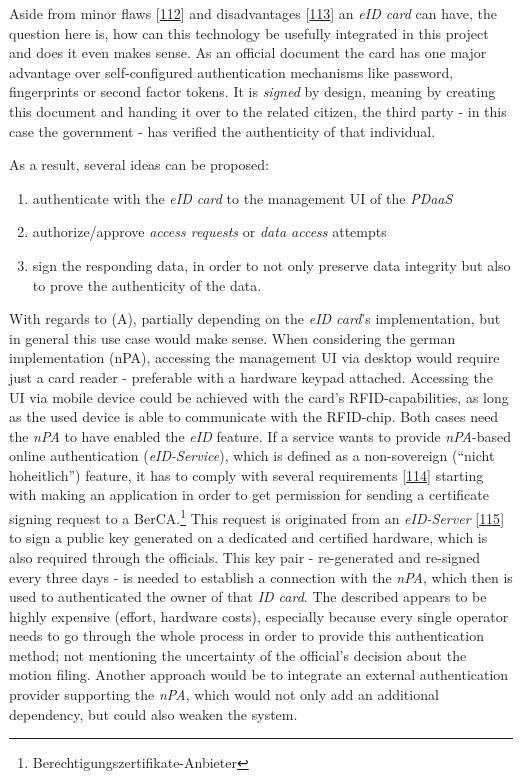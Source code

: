 \documentclass[12pt,english,a4paper,titlepage,cleardoublepage=empty,dottedtoc]{report}
\providecommand{\tightlist}{%
  \setlength{\itemsep}{0pt}\setlength{\parskip}{0pt}}
\begin{document}
Aside from minor flaws
{[}\protect\hyperlink{ref-web_2013_npa-sicherheitsdefizit}{112}{]} and
disadvantages
{[}\protect\hyperlink{ref-web_2014_test-qes-support-in-npa}{113}{]} an
\emph{eID card} can have, the question here is, how can this technology
be usefully integrated in this project and does it even makes sense. As
an official document the card has one major advantage over
self-configured authentication mechanisms like password, fingerprints or
second factor tokens. It is \emph{signed} by design, meaning by creating
this document and handing it over to the related citizen, the third
party - in this case the government - has verified the authenticity of
that individual.

As a result, several ideas can be proposed:

\begin{enumerate}
\def\labelenumi{(\Alph{enumi})}
\tightlist
\item
  authenticate with the \emph{eID card} to the management UI of the
  \emph{PDaaS}
\item
  authorize/approve \emph{access requests} or \emph{data access}
  attempts
\item
  sign the responding data, in order to not only preserve data integrity
  but also to prove the authenticity of the data.
\end{enumerate}

With regards to (A), partially depending on the \emph{eID card}'s
implementation, but in general this use case would make sense. When
considering the german implementation (nPA), accessing the management UI
via desktop would require just a card reader - preferable with a
hardware keypad attached. Accessing the UI via mobile device could be
achieved with the card's RFID-capabilities, as long as the used device
is able to communicate with the RFID-chip. Both cases need the
\emph{nPA} to have enabled the \emph{eID} feature. If a service wants to
provide \emph{nPA}-based online authentication (\emph{eID-Service}),
which is defined as a non-sovereign (``nicht hoheitlich'') feature, it
has to comply with several requirements
{[}\protect\hyperlink{ref-web_bsi-spec_eid}{114}{]} starting with making
an application in order to get permission for sending a certificate
signing request to a BerCA.\footnote{Berechtigungszertifikate-Anbieter}
This request is originated from an \emph{eID-Server}
{[}\protect\hyperlink{ref-web_2017_npa-eid-server}{115}{]} to sign a
public key generated on a dedicated and certified hardware, which is
also required through the officials. This key pair - re-generated and
re-signed every three days - is needed to establish a connection with
the \emph{nPA}, which then is used to authenticated the owner of that
\emph{ID card}. The described appears to be highly expensive (effort,
hardware costs), especially because every single operator needs to go
through the whole process in order to provide this authentication
method; not mentioning the uncertainty of the official's decision about
the motion filing. Another approach would be to integrate an external
authentication provider supporting the \emph{nPA}, which would not only
add an additional dependency, but could also weaken the system.
\end{document}
